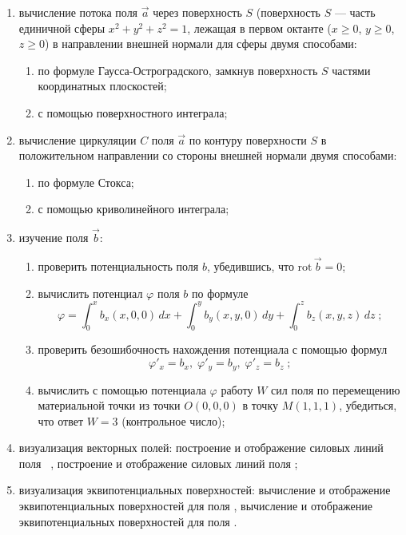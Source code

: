 \documentclass[14pt,a4paper,final]{extreport}
\begin{document}
\begin{enumerate}[label=\asbuk*),ref=\asbuk*]
	\item вычисление потока поля \( \vec a \) через поверхность \( S \) (поверхность \( S \) --- часть единичной сферы \(x^2 + y^2 + z^2 = 1 \), лежащая в первом октанте (\( x \geq 0 \), \( y \geq 0 \), \( z \geq 0 \)) в направлении внешней нормали для сферы двумя способами:
	\begin{enumerate}[label=\arabic*.]
		\item по формуле Гаусса-Остроградского, замкнув поверхность \( S \) частями координатных плоскостей;
		\item с помощью поверхностного интеграла;
	\end{enumerate}
	
	\item вычисление циркуляции \( C \) поля \( \vec a \) по контуру поверхности \( S \) в положительном направлении со стороны внешней нормали двумя способами:
	\begin{enumerate}[label=\arabic*.]
		\item по формуле Стокса;
		\item с помощью криволинейного интеграла;
	\end{enumerate}
	
	\item изучение поля \( \vec b \):
	\begin{enumerate}[label=\arabic*.]
		\item проверить потенциальность поля \( b \), убедившись, что \( \mathrm{rot} \, \vec b = 0 \);
		\item вычислить потенциал \( \varphi \) поля \( b \) по формуле \[ \varphi = \int_0^x{b_x(x,0,0)\,dx} + \int_0^y{b_y(x,y,0)\,dy} +\int_0^z{b_z(x,y,z)\,dz}\;; \]
		\item проверить безошибочность нахождения потенциала с помощью формул \[ \varphi'_x = b_x\mathrm{,}\;\varphi'_y = b_y\mathrm{,}\;\varphi'_z = b_z\;; \]
		\item вычислить с помощью потенциала \( \varphi \) работу \( W \) сил поля по перемещению материальной точки из точки \(O(0,0,0) \) в точку \( M(1,1,1) \), убедиться, что ответ \( W = 3 \) (контрольное число);
	\end{enumerate}
	
	
	\item визуализация векторных полей: построение и отображение силовых линий поля \fieldA\ , построение и отображение силовых линий поля \fieldB;
	
	\item визуализация эквипотенциальных поверхностей: вычисление и отображение эквипотенциальных поверхностей для поля \fieldA, вычисление и отображение эквипотенциальных поверхностей для поля \fieldB.
\end{enumerate}
\end{document}
